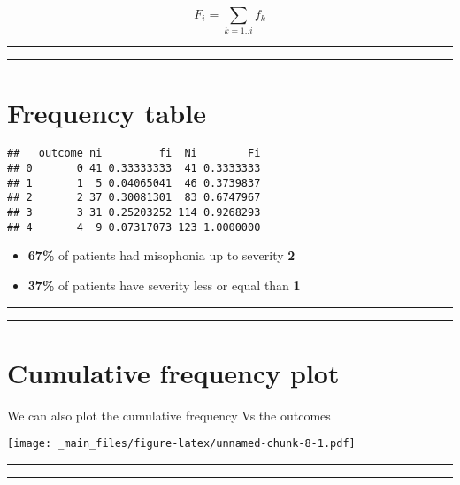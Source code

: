 \documentclass[
]{book}
\begin{document}
\[F_i=\sum_{k=1..i} f_k\]

\begin{center}\rule{0.5\linewidth}{0.5pt}\end{center}

\begin{center}\rule{0.5\linewidth}{0.5pt}\end{center}

\hypertarget{frequency-table}{%
\section{Frequency table}\label{frequency-table}}

\begin{verbatim}
##   outcome ni         fi  Ni        Fi
## 0       0 41 0.33333333  41 0.3333333
## 1       1  5 0.04065041  46 0.3739837
## 2       2 37 0.30081301  83 0.6747967
## 3       3 31 0.25203252 114 0.9268293
## 4       4  9 0.07317073 123 1.0000000
\end{verbatim}

\begin{itemize}
\item
  \textbf{67\%} of patients had misophonia up to severity \textbf{2}
\item
  \textbf{37\%} of patients have severity less or equal than \textbf{1}
\end{itemize}

\begin{center}\rule{0.5\linewidth}{0.5pt}\end{center}

\begin{center}\rule{0.5\linewidth}{0.5pt}\end{center}

\hypertarget{cumulative-frequency-plot}{%
\section{Cumulative frequency plot}\label{cumulative-frequency-plot}}

We can also plot the cumulative frequency Vs the outcomes

\texttt{[image: \_main\_files/figure-latex/unnamed-chunk-8-1.pdf]}

\begin{center}\rule{0.5\linewidth}{0.5pt}\end{center}

\begin{center}\rule{0.5\linewidth}{0.5pt}\end{center}
\end{document}

